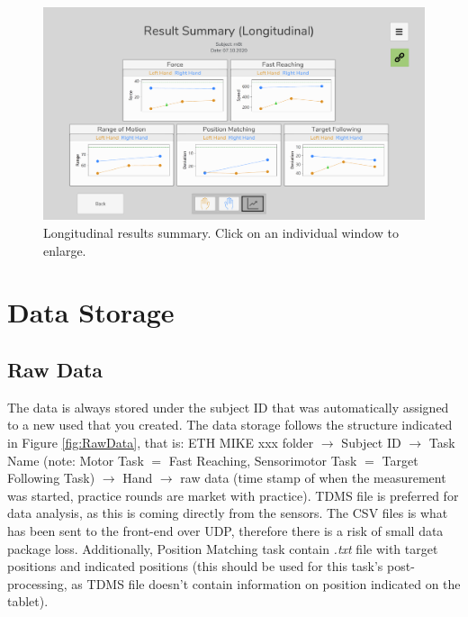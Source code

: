 \documentclass[10pt,oneside,a4paper]{article}
\begin{document}
\begin{figure}[h!]
\begin{center}
\includegraphics[width=\columnwidth]{images/Assessments/LongitudinalResults.png}
\caption{Longitudinal results summary. Click on an individual window to enlarge.}
\label{fig:LongitudinalResults}
\end{center}
\end{figure}

\newpage
\section{Data Storage}
\subsection{Raw Data}
The data is always stored under the subject ID that was automatically assigned to a new used that you created.
The data storage follows the structure indicated in Figure \ref{fig:RawData}, that is:
ETH MIKE xxx folder $\rightarrow$ Subject ID $\rightarrow$ Task Name (note: Motor Task $=$ Fast Reaching, Sensorimotor Task $=$ Target Following Task) $\rightarrow$ Hand $\rightarrow$ raw data (time stamp of when the measurement was started, practice rounds are market with practice).
TDMS file is preferred for data analysis, as this is coming directly from the sensors. The CSV files is what has been sent to the front-end over UDP, therefore there is a risk of small data package loss.
Additionally, Position Matching task contain \emph{.txt} file with target positions and indicated positions (this should be used for this task’s post-processing, as TDMS file doesn’t contain information on position indicated on the tablet).
\end{document}
